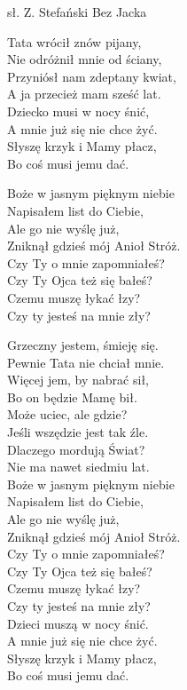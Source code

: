 {sł. Z. Stefański}
{Bez Jacka}
\begin{text}
Tata wrócił znów pijany,\\
Nie odróżnił mnie od ściany,\\
Przyniósł nam zdeptany kwiat,\\
A ja przecież mam sześć lat.\\
Dziecko musi w nocy śnić,\\
A mnie już się nie chce żyć.\\
Słyszę krzyk i Mamy płacz,\\
Bo coś musi jemu dać.

Boże w jasnym pięknym niebie\\
Napisałem list do Ciebie,\\
Ale go nie wyślę już,\\
Zniknął gdzieś mój Anioł Stróż.\\
Czy Ty o mnie zapomniałeś?\\
Czy Ty Ojca też się bałeś?\\
Czemu muszę łykać łzy?\\
Czy ty jesteś na mnie zły?

Grzeczny jestem, śmieję się.\\
Pewnie Tata nie chciał mnie.\\
Więcej jem, by nabrać sił,\\
Bo on będzie Mamę bił.\\
Może uciec, ale gdzie?\\
Jeśli wszędzie jest tak źle.\\
Dlaczego mordują Świat?\\
Nie ma nawet siedmiu lat.\\
Boże w jasnym pięknym niebie\\
Napisałem list do Ciebie,\\
Ale go nie wyślę już,\\
Zniknął gdzieś mój Anioł Stróż.\\
Czy Ty o mnie zapomniałeś?\\
Czy Ty Ojca też się bałeś?\\
Czemu muszę łykać łzy?\\
Czy ty jesteś na mnie zły?\\
Dzieci muszą w nocy śnić.\\
A mnie już się nie chce żyć.\\
Słyszę krzyk i Mamy płacz,\\
Bo coś musi jemu dać.
\end{text}
\begin{chord}
\end{chord}